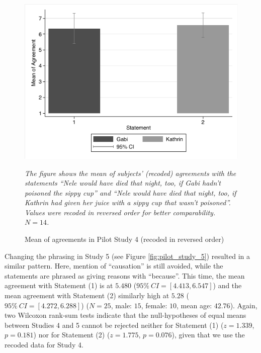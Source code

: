\documentclass[egregdoesnotlikesansseriftitles,12pt]{scrartcl}
\begin{document}
\begin{figure}[H]
   \centering
   \includegraphics[scale=0.8]{figures/pilot_study_4.pdf}
   \begin{minipage}{0.9\linewidth}
   \footnotesize
   \emph{The figure shows the mean of subjects' (recoded) agreements with the statements ``Nele would have died that night, too, if Gabi hadn't poisoned the sippy cup'' and ``Nele would have died that night, too, if Kathrin had given her juice with a sippy cup that wasn't poisoned''. Values were recoded in reversed order for better comparability. $N=14$.}
   \end{minipage}
   \caption{Mean of agreements in Pilot Study 4 (recoded in reversed order)}
   \label{fig:pilot_study_4}
\end{figure}

\noindent Changing the phrasing in Study 5 (see Figure \ref{fig:pilot_study_5}) resulted in a similar pattern. Here, mention of ``causation'' is still avoided, while the statements are phrased as giving reasons with ``because''. This time, the mean agreement with Statement (1) is at $5.480$ ($95\%~CI=[4.413,6.547]$) and the mean agreement with Statement (2) similarly high at $5.28$ ($95\%~CI=[4.272,6.288]$) ($N=25$, male: $15$, female: $10$, mean age: $42.76$). Again, two Wilcoxon rank-sum tests indicate that the null-hypotheses of equal means between Studies 4 and 5 cannot be rejected neither for Statement (1) ($z=1.339$, $p=0.181$) nor for Statement (2) ($z=1.775$, $p=0.076$), given that we use the recoded data for Study 4.
\end{document}
